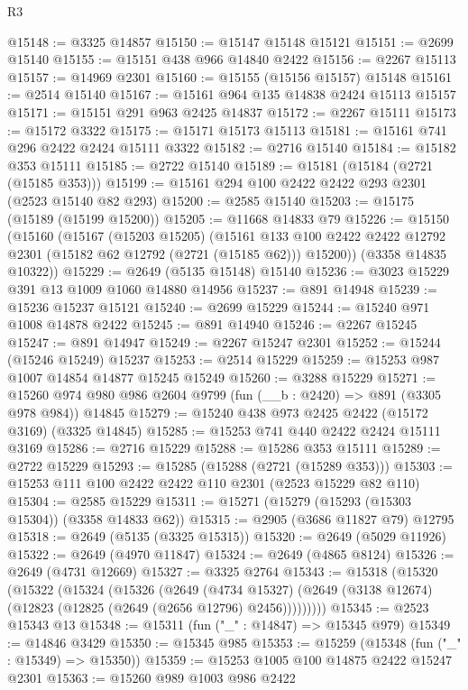 \begin{lexlean}{R3}
\begin{coremodule}
@15148 := @3325 @14857
@15150 := @15147 @15148 @15121
@15151 := @2699 @15140
@15155 := @15151 @438 @966 @14840 @2422
@15156 := @2267 @15113
@15157 := @14969 @2301
@15160 := @15155 (@15156 @15157) @15148
@15161 := @2514 @15140
@15167 := @15161 @964 @135 @14838 @2424 @15113 @15157
@15171 := @15151 @291 @963 @2425 @14837
@15172 := @2267 @15111
@15173 := @15172 @3322
@15175 := @15171 @15173 @15113
@15181 := @15161 @741 @296 @2422 @2424 @15111 @3322
@15182 := @2716 @15140
@15184 := @15182 @353 @15111
@15185 := @2722 @15140
@15189 := @15181 (@15184 (@2721 (@15185 @353)))
@15199 := @15161 @294 @100 @2422 @2422 @293 @2301 (@2523 @15140 @82 @293)
@15200 := @2585 @15140
@15203 := @15175 (@15189 (@15199 @15200))
@15205 := @11668 @14833 @79
@15226 := @15150
    (@15160
      (@15167
        (@15203 @15205)
        (@15161 @133 @100 @2422 @2422 @12792 @2301 (@15182 @62 @12792 (@2721 (@15185 @62))) @15200))
      (@3358 @14835 @10322))
@15229 := @2649 (@5135 @15148) @15140
@15236 := @3023 @15229 @391 @13 @1009 @1060 @14880 @14956
@15237 := @891 @14948
@15239 := @15236 @15237 @15121
@15240 := @2699 @15229
@15244 := @15240 @971 @1008 @14878 @2422
@15245 := @891 @14940
@15246 := @2267 @15245
@15247 := @891 @14947
@15249 := @2267 @15247 @2301
@15252 := @15244 (@15246 @15249) @15237
@15253 := @2514 @15229
@15259 := @15253 @987 @1007 @14854 @14877 @15245 @15249
@15260 := @3288 @15229
@15271 := @15260 @974 @980 @986 @2604 @9799 (fun (__b : @2420) => @891 (@3305 @978 @984)) @14845
@15279 := @15240 @438 @973 @2425 @2422 (@15172 @3169) (@3325 @14845)
@15285 := @15253 @741 @440 @2422 @2424 @15111 @3169
@15286 := @2716 @15229
@15288 := @15286 @353 @15111
@15289 := @2722 @15229
@15293 := @15285 (@15288 (@2721 (@15289 @353)))
@15303 := @15253 @111 @100 @2422 @2422 @110 @2301 (@2523 @15229 @82 @110)
@15304 := @2585 @15229
@15311 := @15271 (@15279 (@15293 (@15303 @15304)) (@3358 @14833 @62))
@15315 := @2905 (@3686 @11827 @79) @12795
@15318 := @2649 (@5135 (@3325 @15315))
@15320 := @2649 (@5029 @11926)
@15322 := @2649 (@4970 @11847)
@15324 := @2649 (@4865 @8124)
@15326 := @2649 (@4731 @12669)
@15327 := @3325 @2764
@15343 := @15318
    (@15320
      (@15322
        (@15324
          (@15326
            (@2649
              (@4734 @15327)
              (@2649 (@3138 @12674) (@12823 (@12825 (@2649 (@2656 @12796) @2456)))))))))
@15345 := @2523 @15343 @13
@15348 := @15311 (fun ("_" : @14847) => @15345 @979)
@15349 := @14846 @3429
@15350 := @15345 @985
@15353 := @15259 (@15348 (fun ("_" : @15349) => @15350))
@15359 := @15253 @1005 @100 @14875 @2422 @15247 @2301
@15363 := @15260 @989 @1003 @986 @2422

\end{coremodule}
\end{lexlean}

